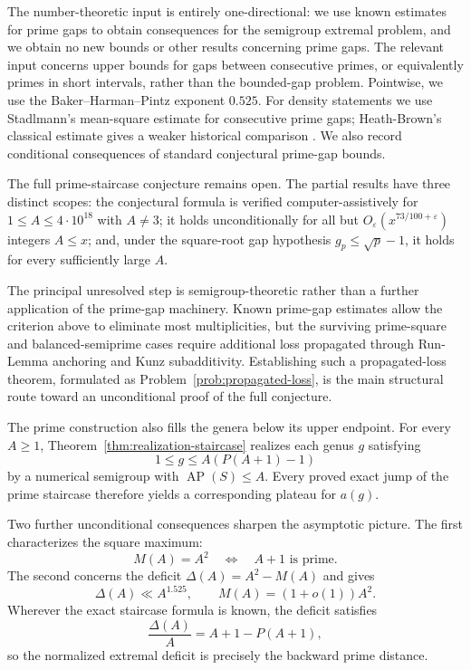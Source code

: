 \documentclass[11pt]{article}
\theoremstyle{plain}
\theoremstyle{definition}
\theoremstyle{remark}
\newcommand{\AP}{\operatorname{AP}}
\begin{document}
The number-theoretic input is entirely one-directional: we use known
estimates for prime gaps to obtain consequences for the semigroup extremal
problem, and we obtain no new bounds or other results concerning prime gaps.
The relevant input concerns upper bounds for gaps between consecutive
primes, or equivalently primes in short intervals, rather than the
bounded-gap problem.  Pointwise, we use the Baker--Harman--Pintz exponent
$0.525$.  For density statements we use Stadlmann's mean-square estimate for
consecutive prime gaps; Heath-Brown's classical estimate gives a weaker
historical comparison
\cite{baker-harman-pintz,heath-brown-iii,stadlmann-mean-square}.
We also record conditional consequences of standard conjectural prime-gap
bounds.

The full prime-staircase conjecture remains open.  The partial results have
three distinct scopes: the conjectural formula is verified computer-assistively
for $1\leq A\leq4\cdot10^{18}$ with $A\neq3$; it holds unconditionally for
all but $O_\varepsilon(x^{73/100+\varepsilon})$ integers $A\leq x$; and,
under the square-root gap hypothesis $g_p\leq\sqrt p-1$, it holds for every
sufficiently large $A$.

The principal unresolved step is semigroup-theoretic rather than a further
application of the prime-gap machinery.  Known prime-gap estimates allow the
criterion above to eliminate most multiplicities, but the surviving
prime-square and balanced-semiprime cases require additional loss propagated
through Run-Lemma anchoring and Kunz subadditivity.  Establishing such a
propagated-loss theorem, formulated as Problem~\ref{prob:propagated-loss}, is
the main structural route toward an unconditional proof of the full
conjecture.

The prime construction also fills the genera below its upper endpoint.  For
every $A\geq1$, Theorem~\ref{thm:realization-staircase} realizes each genus
$g$ satisfying
\[
  1\leq g\leq A(P(A+1)-1)
\]
by a numerical semigroup with $\AP(S)\leq A$.  Every proved exact jump of the
prime staircase therefore yields a corresponding plateau for $a(g)$.

Two further unconditional consequences sharpen the asymptotic picture.  The
first characterizes the square maximum:
\[
  M(A)=A^2\quad\Longleftrightarrow\quad A+1\text{ is prime}.
\]
The second concerns the deficit $\Delta(A)=A^2-M(A)$ and gives
\[
  \Delta(A)\ll A^{1.525},
  \qquad M(A)=(1+o(1))A^2.
\]
Wherever the exact staircase formula is known, the deficit satisfies
\[
  \frac{\Delta(A)}A=A+1-P(A+1),
\]
so the normalized extremal deficit is precisely the backward prime distance.
\end{document}

